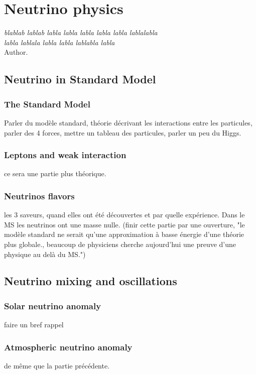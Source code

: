 \documentclass[main.tex]{subfiles}
\begin{document}
\chapter{Neutrino physics}
 \begin{flushright}
\textit{blablab lablab labla labla labla labla labla lablalabla \\ 
labla lablala labla labla lablabla labla}\\
Author.
\end{flushright} 


\section{Neutrino in Standard Model}

\subsection{The Standard Model}
\NI Parler du modèle standard, théorie décrivant les interactions entre les particules, parler des 4 forces, mettre un tableau des particules, parler un peu du Higgs.

\subsection{Leptons and weak interaction}
\NI ce sera une partie plus théorique.

\subsection{Neutrinos flavors}
les 3 saveurs, quand elles ont été découvertes et par quelle expérience. Dans le MS les neutrinos ont une masse nulle. (finir cette partie par une ouverture, "le modèle standard ne serait qu'une approximation à basse énergie d'une théorie plus globale., beaucoup de physiciens cherche aujourd'hui une preuve d'une physique au delà du MS.")

\section{Neutrino mixing and oscillations}
\subsection{Solar neutrino anomaly}
\NI faire un bref rappel

\subsection{Atmospheric neutrino anomaly}
\NI de m\^eme que la partie précédente.
\end{document}
